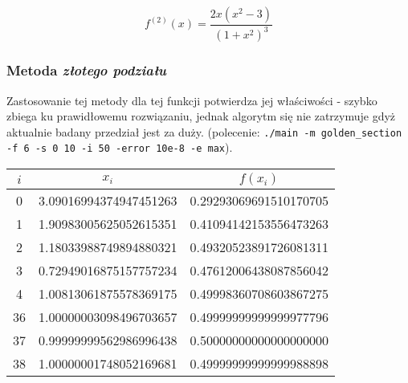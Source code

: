 \documentclass[a4paper,11pt]{article}
\begin{document}
      \begin{center}
      \end{center}
      $$ f^{(2)}(x) = \frac{2x(x^2 - 3)}{(1+x^2)^3} $$
      
      \subsubsection{Metoda \emph{złotego podziału}}
      Zastosowanie tej metody dla tej funkcji potwierdza jej właściwości - szybko zbiega ku prawidłowemu rozwiązaniu, jednak algorytm się nie zatrzymuje gdyż aktualnie badany przedział jest za duży. (polecenie: \texttt{./main -m golden\_section -f 6 -s 0 10 -i 50 -error 10e-8 -e max}).
      \begin{center}
      \begin{tabular}{S[table-format=1.0]S[table-format=-1.9]S[table-format=-1.15,table-auto-round=false]}
        \toprule
        {$i$}                & {$x_i$}               & {$f(x_i)$}            \\  & 3.09016994374947451263 & 0.29293069691510170705 \\
          1 & 1.90983005625052615351 & 0.41094142153556473263 \\
          2 & 1.18033988749894880321 & 0.49320523891726081311 \\
          3 & 0.72949016875157757234 & 0.47612006438087856042 \\
          4 & 1.00813061875578369175 & 0.49998360708603867275 \\
          36 & 1.00000003098496703657 & 0.49999999999999977796 \\
          37 & 0.99999999562986996438 & 0.50000000000000000000 \\
          38 & 1.00000001748052169681 & 0.49999999999999988898 \\ \bottomrule
        \end{tabular}
    \end{center}
    
\end{document}
